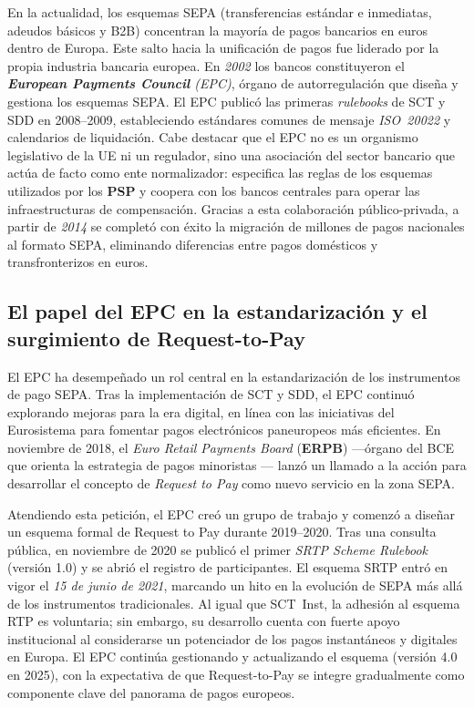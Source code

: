 En la actualidad, los esquemas SEPA (transferencias estándar e inmediatas, adeudos básicos y B2B) concentran la mayoría de pagos bancarios en euros dentro de Europa. Este salto hacia la unificación de pagos fue liderado por la propia industria bancaria europea. En \textit{2002} los bancos constituyeron el \textit{\textbf{European Payments Council} (EPC)}, órgano de autorregulación que diseña y gestiona los esquemas SEPA. El EPC publicó las primeras \emph{rulebooks} de SCT y SDD en 2008–2009, estableciendo estándares comunes de mensaje \emph{ISO~20022} y calendarios de liquidación. Cabe destacar que el EPC no es un organismo legislativo de la UE ni un regulador, sino una asociación del sector bancario que actúa de facto como ente normalizador: especifica las reglas de los esquemas utilizados por los \textbf{PSP} y coopera con los bancos centrales para operar las infraestructuras de compensación. Gracias a esta colaboración público-privada, a partir de \textit{2014} se completó con éxito la migración de millones de pagos nacionales al formato SEPA, eliminando diferencias entre pagos domésticos y transfronterizos en euros.

\subsection{El papel del EPC en la estandarización y el surgimiento de Request-to-Pay}
\label{subsec:epc-rtp}

El EPC ha desempeñado un rol central en la estandarización de los instrumentos de pago SEPA. Tras la implementación de SCT y SDD, el EPC continuó explorando mejoras para la era digital, en línea con las iniciativas del Eurosistema para fomentar pagos electrónicos paneuropeos más eficientes. En noviembre de 2018, el \emph{Euro Retail Payments Board} (\textbf{ERPB}) —órgano del BCE que orienta la estrategia de pagos minoristas \cite{ECB_ERPB} — lanzó un llamado a la acción para desarrollar el concepto de \emph{Request to Pay} como nuevo servicio en la zona SEPA.  

Atendiendo esta petición, el EPC creó un grupo de trabajo y comenzó a diseñar un esquema formal de Request to Pay durante 2019–2020. Tras una consulta pública, en noviembre de 2020 se publicó el primer \emph{SRTP Scheme Rulebook} (versión 1.0) y se abrió el registro de participantes. El esquema SRTP entró en vigor el \textit{15 de junio de 2021}, marcando un hito en la evolución de SEPA más allá de los instrumentos tradicionales. Al igual que SCT~Inst, la adhesión al esquema RTP es voluntaria; sin embargo, su desarrollo cuenta con fuerte apoyo institucional al considerarse un potenciador de los pagos instantáneos y digitales en Europa. El EPC continúa gestionando y actualizando el esquema (versión 4.0 en 2025), con la expectativa de que Request-to-Pay se integre gradualmente como componente clave del panorama de pagos europeos.

